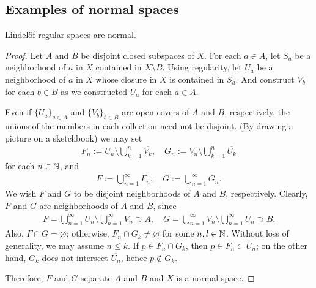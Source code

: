\subsection{Examples of normal spaces}
\begin{thm}
    Lindel\"{o}f regular spaces are normal.
\end{thm}
\begin{proof}
    Let $A$ and $B$ be disjoint closed subspaces of $X$.
    For each $a\in A$, let $S_a$ be a neighborhood of $a$ in $X$ contained in $X\setminus B$.
    Using regularity, let $U_a$ be a neighborhood of $a$ in $X$ whose closure in $X$ is contained in $S_a$.
    And construct $V_b$ for each $b\in B$ as we constructed $U_a$ for each $a\in A$.

    Even if $\{U_a\}_{a\in A}$ and $\{V_b\}_{b\in B}$ are open covers of $A$ and $B$, respectively, the unions of the members in each collection need not be disjoint.
    (By drawing a picture on a sketchbook) we may set
    \begin{align*}
        F_n:=U_n\setminus\bigcup_{k=1}^n\overline{V_k},\quad G_n:=V_n\setminus\bigcup_{k=1}^n\overline{U_k}
    \end{align*}
    for each $n\in{\mathbb{N}}$, and
    \begin{align*}
        F:=\bigcup_{n=1}^\infty F_n,\quad G:=\bigcup_{n=1}^\infty G_n.
    \end{align*}
    We wish $F$ and $G$ to be disjoint neighborhoods of $A$ and $B$, respectively.
    Clearly, $F$ and $G$ are neighborhoods of $A$ and $B$, since
    \begin{align*}
        F=\bigcup_{n=1}^\infty U_n\setminus\bigcup_{n=1}^\infty\overline{V_n}\supset A,\quad G=\bigcup_{n=1}^\infty V_n\setminus\bigcup_{n=1}^\infty\overline{U_n}\supset B.
    \end{align*}
    Also, $F\cap G=\varnothing$; otherwise, $F_n\cap G_k\neq\varnothing$ for some $n, l\in{\mathbb{N}}$.
    Without loss of generality, we may assume $n\leq k$.
    If $p\in F_n\cap G_k$, then $p\in F_n\subset U_n$; on the other hand, $G_k$ does not intersect $\overline{U_n}$, hence $p\notin G_k$.
    
    Therefore, $F$ and $G$ separate $A$ and $B$ and $X$ is a normal space.
\end{proof}

